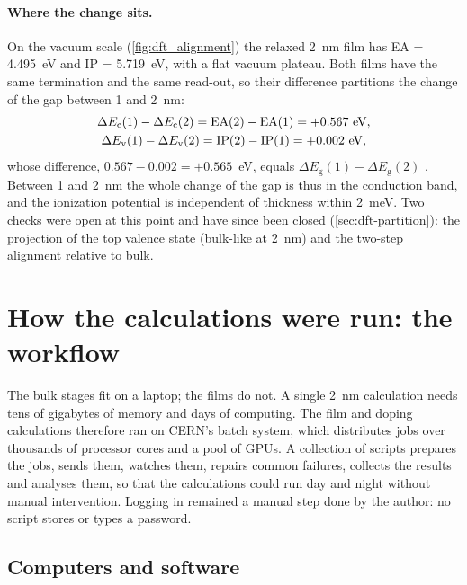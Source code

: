 \paragraph{Where the change sits.} On the vacuum scale (\cref{fig:dft_alignment}) the relaxed 2~nm film has EA = 4.495~eV
and IP = 5.719~eV, with a flat vacuum plateau. Both films have the same termination and the same read-out, so their
difference partitions the change of the gap between 1 and 2~nm:
\begin{equation}
\begin{gathered}
\Delta E_{\mathrm{c}}(1) - \Delta E_{\mathrm{c}}(2) = \mathrm{EA}(2) - \mathrm{EA}(1) = +0.567~\mathrm{eV}, \\
\Delta E_{\mathrm{v}}(1) - \Delta E_{\mathrm{v}}(2) = \mathrm{IP}(2) - \mathrm{IP}(1) = +0.002~\mathrm{eV},
\end{gathered}
\end{equation}
whose difference, $0.567 - 0.002 = +0.565$~eV, equals $\Delta E_{\mathrm{g}}(1) - \Delta E_{\mathrm{g}}(2)$
 . Between 1 and 2~nm the whole change of
the gap is thus in the conduction band, and the ionization potential is independent of thickness within 2~meV. Two
checks were open at this point and have since been closed (\cref{sec:dft-partition}): the projection of the top valence
state (bulk-like at 2~nm) and the two-step alignment relative to bulk.

\section{How the calculations were run: the workflow}
\label{sec:dft-compute}

\begin{dftplain}
The bulk stages fit on a laptop; the films do not. A single 2~nm calculation needs tens of gigabytes of memory and days
of computing. The film and doping calculations therefore ran on CERN's batch system, which distributes jobs over
thousands of processor cores and a pool of GPUs. A collection of scripts prepares the jobs, sends them, watches them,
repairs common failures, collects the results and analyses them, so that the calculations could run day and night
without manual intervention. Logging in remained a manual step done by the author: no script stores or types a
password.
\end{dftplain}

\subsection{Computers and software}
\label{sec:dft-cern}

